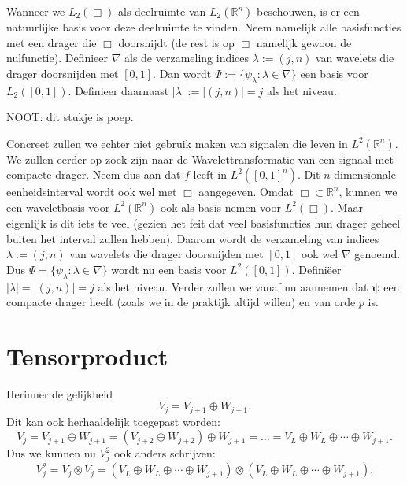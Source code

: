 \documentclass[11pt]{uvamath}
\newcommand{\R}{\mathbb{R}}
\theoremstyle{plain}
\theoremstyle{definition}
\theoremstyle{remark}
\begin{document}
Wanneer we $L_2(\Box)$ als deelruimte van $L_2(\R^n)$ beschouwen, is er een natuurlijke basis voor deze deelruimte te vinden. Neem namelijk alle basisfuncties met een drager die $\Box$ doorsnijdt (de rest is op $\Box$ namelijk gewoon de nulfunctie). Definieer $\nabla$ als de verzameling indices $\lambda := (j, n)$ van wavelets die drager doorsnijden met $[0,1]$. Dan wordt $\Psi := \{ \psi_\lambda: \lambda \in \nabla \}$ een basis voor $L_2([0,1])$. Definieer daarnaast $|\lambda| := |(j,n)| = j$ als het niveau.

NOOT: dit stukje is poep.


Concreet zullen we echter niet gebruik maken van signalen die leven in $L^2(\R^n)$. We zullen eerder op zoek zijn naar de Wavelettransformatie van een signaal met compacte drager. Neem dus aan dat $f$ leeft in $L^2([0,1]^n)$. Dit $n$-dimensionale eenheidsinterval wordt ook wel met $\Box$ aangegeven. Omdat $\Box \subset \R^n$, kunnen we een waveletbasis voor $L^2(\R^n)$ ook als basis nemen voor $L^2(\Box)$. Maar eigenlijk is dit iets te veel (gezien het feit dat veel basisfuncties hun drager geheel buiten het interval zullen hebben). Daarom wordt de verzameling van indices $\lambda := (j,n)$ van wavelets die drager doorsnijden met $[0,1]$ ook wel $\nabla$ genoemd. Dus $\Psi = \{ \psi_\lambda: \lambda \in \nabla \}$ wordt nu een basis voor $L^2([0,1])$. Defini\"eer $|\lambda| = |(j,n)| = j$ als het niveau.
Verder zullen we vanaf nu aannemen dat $\boldsymbol\psi$ een compacte drager heeft (zoals we in de praktijk altijd willen) en van orde $p$ is.
\fi

\section{Tensorproduct}
Herinner de gelijkheid
\[
	V_{j} = V_{j+1} \oplus W_{j+1}.
\]
Dit kan ook herhaaldelijk toegepast worden:
\[
	V_j = V_{j+1} \oplus W_{j+1} = (V_{j+2} \oplus W_{j+2} ) \oplus W_{j+1} = \ldots = V_{L} \oplus W_L \oplus \cdots \oplus W_{j+1}.
\]
Dus we kunnen nu $V_j^2$ ook anders schrijven:
\[
	V_j^2 = V_j \otimes V_j = (V_{L} \oplus W_L \oplus \cdots \oplus W_{j+1}) \otimes (V_{L} \oplus W_L \oplus \cdots \oplus W_{j+1}).
\]
\end{document}
